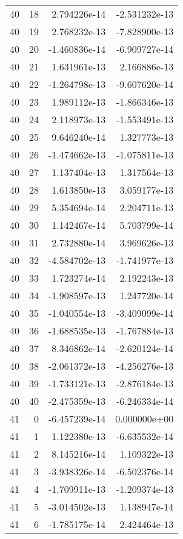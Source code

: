 \begin{tabular}{rrrr}
  40 &   18 &  2.794226e-14 & -2.531232e-13 \\
  40 &   19 &  2.768232e-13 & -7.828900e-13 \\
  40 &   20 & -1.460836e-14 & -6.909727e-14 \\
  40 &   21 &  1.631961e-13 &  2.166886e-13 \\
  40 &   22 & -1.264798e-13 & -9.607620e-14 \\
  40 &   23 &  1.989112e-13 & -1.866346e-13 \\
  40 &   24 &  2.118973e-13 & -1.553491e-13 \\
  40 &   25 &  9.646240e-14 &  1.327773e-13 \\
  40 &   26 & -1.474662e-13 & -1.075811e-13 \\
  40 &   27 &  1.137404e-13 &  1.317564e-13 \\
  40 &   28 &  1.613850e-13 &  3.059177e-13 \\
  40 &   29 &  5.354694e-14 &  2.204711e-13 \\
  40 &   30 &  1.142467e-14 &  5.703799e-14 \\
  40 &   31 &  2.732880e-14 &  3.969626e-13 \\
  40 &   32 & -4.584702e-13 & -1.741977e-13 \\
  40 &   33 &  1.723274e-14 &  2.192243e-13 \\
  40 &   34 & -1.908597e-13 &  1.247720e-14 \\
  40 &   35 & -1.040554e-13 & -3.409099e-14 \\
  40 &   36 & -1.688535e-13 & -1.767884e-13 \\
  40 &   37 &  8.346862e-14 & -2.620124e-14 \\
  40 &   38 & -2.061372e-13 & -4.256276e-13 \\
  40 &   39 & -1.733121e-13 & -2.876184e-13 \\
  40 &   40 & -2.475359e-13 & -6.246334e-14 \\
  41 &    0 & -6.457239e-14 &  0.000000e+00 \\
  41 &    1 &  1.122380e-13 & -6.635532e-14 \\
  41 &    2 &  8.145216e-14 &  1.109322e-13 \\
  41 &    3 & -3.938326e-14 & -6.502376e-14 \\
  41 &    4 & -1.709911e-13 & -1.209374e-13 \\
  41 &    5 & -3.014502e-13 &  1.138947e-14 \\
  41 &    6 & -1.785175e-14 &  2.424464e-13 \\

\end{tabular}
